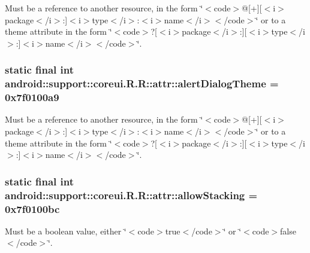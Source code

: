 Must be a reference to another resource, in the form \char`\"{}$<$code$>$@\mbox{[}+\mbox{]}\mbox{[}$<$i$>$package$<$/i$>$:\mbox{]}$<$i$>$type$<$/i$>$:$<$i$>$name$<$/i$>$$<$/code$>$\char`\"{} or to a theme attribute in the form \char`\"{}$<$code$>$?\mbox{[}$<$i$>$package$<$/i$>$:\mbox{]}\mbox{[}$<$i$>$type$<$/i$>$:\mbox{]}$<$i$>$name$<$/i$>$$<$/code$>$\char`\"{}. \hypertarget{classandroid_1_1support_1_1coreui_1_1_r_1_1attr_c5dd205eabea4821a7710ef284c1319a}{
\subsubsection[{alertDialogTheme}]{\setlength{\rightskip}{0pt plus 5cm}static final int android::support::coreui.R.R::attr::alertDialogTheme = 0x7f0100a9}}
\label{classandroid_1_1support_1_1coreui_1_1_r_1_1attr_c5dd205eabea4821a7710ef284c1319a}


Must be a reference to another resource, in the form \char`\"{}$<$code$>$@\mbox{[}+\mbox{]}\mbox{[}$<$i$>$package$<$/i$>$:\mbox{]}$<$i$>$type$<$/i$>$:$<$i$>$name$<$/i$>$$<$/code$>$\char`\"{} or to a theme attribute in the form \char`\"{}$<$code$>$?\mbox{[}$<$i$>$package$<$/i$>$:\mbox{]}\mbox{[}$<$i$>$type$<$/i$>$:\mbox{]}$<$i$>$name$<$/i$>$$<$/code$>$\char`\"{}. \hypertarget{classandroid_1_1support_1_1coreui_1_1_r_1_1attr_b913146b5d1e2b271f35f12bd2e1c0dd}{
\subsubsection[{allowStacking}]{\setlength{\rightskip}{0pt plus 5cm}static final int android::support::coreui.R.R::attr::allowStacking = 0x7f0100bc}}
\label{classandroid_1_1support_1_1coreui_1_1_r_1_1attr_b913146b5d1e2b271f35f12bd2e1c0dd}


Must be a boolean value, either \char`\"{}$<$code$>$true$<$/code$>$\char`\"{} or \char`\"{}$<$code$>$false$<$/code$>$\char`\"{}. 

